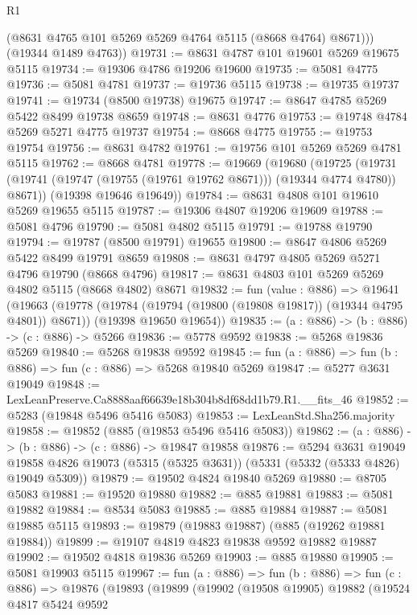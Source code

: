 \begin{lexlean}{R1}
\begin{coremodule}
          (@8631 @4765 @101 @5269 @5269 @4764 @5115 (@8668 @4764) @8671)))
      (@19344 @1489 @4763))
@19731 := @8631 @4787 @101 @19601 @5269 @19675 @5115
@19734 := @19306 @4786 @19206 @19600
@19735 := @5081 @4775
@19736 := @5081 @4781
@19737 := @19736 @5115
@19738 := @19735 @19737
@19741 := @19734 (@8500 @19738) @19675
@19747 := @8647 @4785 @5269 @5422 @8499 @19738 @8659
@19748 := @8631 @4776
@19753 := @19748 @4784 @5269 @5271 @4775 @19737
@19754 := @8668 @4775
@19755 := @19753 @19754
@19756 := @8631 @4782
@19761 := @19756 @101 @5269 @5269 @4781 @5115
@19762 := @8668 @4781
@19778 := @19669
    (@19680
      (@19725 (@19731 (@19741 (@19747 (@19755 (@19761 @19762 @8671))) (@19344 @4774 @4780)) @8671))
      (@19398 @19646 @19649))
@19784 := @8631 @4808 @101 @19610 @5269 @19655 @5115
@19787 := @19306 @4807 @19206 @19609
@19788 := @5081 @4796
@19790 := @5081 @4802 @5115
@19791 := @19788 @19790
@19794 := @19787 (@8500 @19791) @19655
@19800 := @8647 @4806 @5269 @5422 @8499 @19791 @8659
@19808 := @8631 @4797 @4805 @5269 @5271 @4796 @19790 (@8668 @4796)
@19817 := @8631 @4803 @101 @5269 @5269 @4802 @5115 (@8668 @4802) @8671
@19832 := fun (value : @886) =>
  @19641
    (@19663
      (@19778 (@19784 (@19794 (@19800 (@19808 @19817)) (@19344 @4795 @4801)) @8671))
      (@19398 @19650 @19654))
@19835 := (a : @886) -> (b : @886) -> (c : @886) -> @5266
@19836 := @5778 @9592
@19838 := @5268 @19836 @5269
@19840 := @5268 @19838 @9592
@19845 := fun (a : @886) => fun (b : @886) => fun (c : @886) => @5268 @19840 @5269
@19847 := @5277 @3631 @19049
@19848 := LexLeanPreserve.Ca8888aaf66639e18b304b8df68dd1b79.R1.__fits_46
@19852 := @5283 (@19848 @5496 @5416 @5083)
@19853 := LexLeanStd.Sha256.majority
@19858 := @19852 (@885 (@19853 @5496 @5416 @5083))
@19862 := (a : @886) -> (b : @886) -> (c : @886) -> @19847 @19858
@19876 := @5294
    @3631
    @19049
    @19858
    @4826
    @19073
    (@5315 (@5325 @3631))
    (@5331 (@5332 (@5333 @4826) @19049 @5309))
@19879 := @19502 @4824 @19840 @5269
@19880 := @8705 @5083
@19881 := @19520 @19880
@19882 := @885 @19881
@19883 := @5081 @19882
@19884 := @8534 @5083
@19885 := @885 @19884
@19887 := @5081 @19885 @5115
@19893 := @19879 (@19883 @19887) (@885 (@19262 @19881 @19884))
@19899 := @19107 @4819 @4823 @19838 @9592 @19882 @19887
@19902 := @19502 @4818 @19836 @5269
@19903 := @885 @19880
@19905 := @5081 @19903 @5115
@19967 := fun (a : @886) =>
  fun (b : @886) =>
  fun (c : @886) =>
  @19876
    (@19893
      (@19899
        (@19902
          (@19508 @19905)
          @19882
          (@19524
            @4817
            @5424
            @9592

\end{coremodule}
\end{lexlean}
